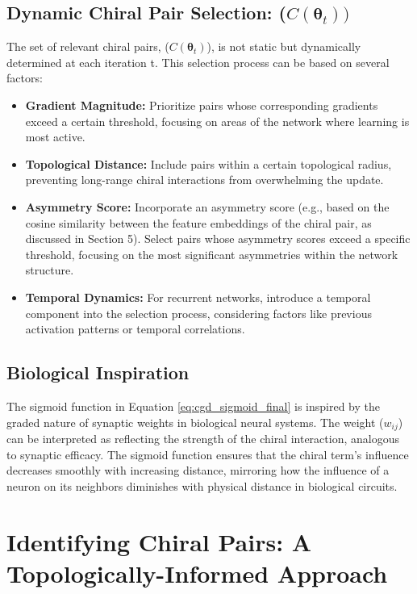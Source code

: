 \documentclass[12pt, a4paper]{article}
\begin{document}
\subsection{Dynamic Chiral Pair Selection: ($C(\boldsymbol{\theta}_t))$}

The set of relevant chiral pairs, ($C(\boldsymbol{\theta}_t)$), is not static but dynamically determined at each iteration t. This selection process can be based on several factors:

\begin{itemize}
\item \textbf{Gradient Magnitude:} Prioritize pairs whose corresponding gradients exceed a certain threshold, focusing on areas of the network where learning is most active.
\item \textbf{Topological Distance:} Include pairs within a certain topological radius, preventing long-range chiral interactions from overwhelming the update.
\item \textbf{Asymmetry Score:} Incorporate an asymmetry score (e.g., based on the cosine similarity between the feature embeddings of the chiral pair, as discussed in Section 5). Select pairs whose asymmetry scores exceed a specific threshold, focusing on the most significant asymmetries within the network structure.
\item \textbf{Temporal Dynamics:} For recurrent networks, introduce a temporal component into the selection process, considering factors like previous activation patterns or temporal correlations.
\end{itemize}

\subsection{Biological Inspiration}

The sigmoid function in Equation \ref{eq:cgd_sigmoid_final} is inspired by the graded nature of synaptic weights in biological neural systems. The weight ($w_{ij}$) can be interpreted as reflecting the strength of the chiral interaction, analogous to synaptic efficacy. The sigmoid function ensures that the chiral term's influence decreases smoothly with increasing distance, mirroring how the influence of a neuron on its neighbors diminishes with physical distance in biological circuits.






 
\section{Identifying Chiral Pairs: A Topologically-Informed Approach}
\end{document}
